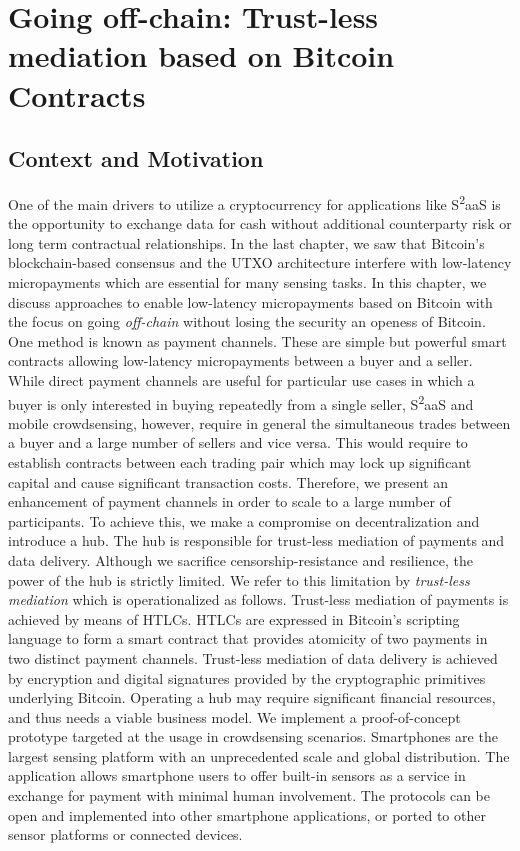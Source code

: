 \chapter{Going off-chain: Trust-less mediation based on Bitcoin Contracts}
\section{Context and Motivation}

One of the main drivers to utilize a cryptocurrency for applications like S\textsuperscript{2}aaS is the opportunity to exchange data for cash without additional counterparty risk or long term contractual relationships. In the last chapter, we saw that Bitcoin's blockchain-based consensus and the \ac{UTXO} architecture interfere with low-latency micropayments which are essential for many sensing tasks. In this chapter, we discuss approaches to enable low-latency micropayments based on Bitcoin with the focus on going \emph{off-chain} without losing the security an openess of Bitcoin.
One method is known as payment channels. These are simple but powerful smart contracts allowing low-latency micropayments between a buyer and a seller. While direct payment channels are useful for particular use cases in which a buyer is only interested in buying repeatedly from a single seller, S\textsuperscript{2}aaS and mobile crowdsensing, however, require in general the simultaneous trades between a buyer and a large number of sellers and vice versa. This would require to establish contracts between each trading pair which may lock up significant capital and cause significant transaction costs. Therefore, we present an enhancement of payment channels in order to scale to a large number of participants. To achieve this, we make a compromise on decentralization and introduce a hub. The hub is responsible for trust-less mediation of payments and data delivery. Although we sacrifice censorship-resistance and resilience, the power of the hub is strictly limited. We refer to this limitation by \emph{trust-less mediation} which is operationalized as follows. Trust-less mediation of payments is achieved by means of \ac{HTLC}s. \ac{HTLC}s are expressed in Bitcoin's scripting language to form a smart contract that provides atomicity of two payments in two distinct payment channels. Trust-less mediation of data delivery is achieved by encryption and digital signatures provided by the cryptographic primitives underlying Bitcoin. Operating a hub may require significant financial resources, and thus needs a viable business model.
We implement a proof-of-concept prototype targeted at the usage in crowdsensing scenarios. Smartphones are the largest sensing platform with an unprecedented scale and global distribution. The application allows smartphone users to offer built-in sensors as a service in exchange for payment with minimal human involvement. The protocols can be open and implemented into other smartphone applications, or ported to other sensor platforms or connected devices.

